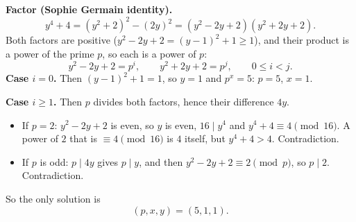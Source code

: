 \textbf{Factor (Sophie Germain identity).}
\[
y^4+4=\left(y^2+2\right)^2-(2y)^2=\left(y^2-2y+2\right)\left(y^2+2y+2\right).
\]
Both factors are positive ($y^2-2y+2=(y-1)^2+1\ge1$), and their product is a power of the prime $p$, so each is a power of $p$:
\[
y^2-2y+2=p^i,\qquad y^2+2y+2=p^j,\qquad 0\le i<j .
\]
\textbf{Case $i=0$.} Then $(y-1)^2+1=1$, so $y=1$ and $p^x=5$: $p=5$, $x=1$.

\textbf{Case $i\ge1$.} Then $p$ divides both factors, hence their difference $4y$.
\begin{itemize}
\item If $p=2$: $y^2-2y+2$ is even, so $y$ is even, $16\mid y^4$ and $y^4+4\equiv4\pmod{16}$. A power of $2$ that is $\equiv4\pmod{16}$ is $4$ itself, but $y^4+4>4$. Contradiction.
\item If $p$ is odd: $p\mid4y$ gives $p\mid y$, and then $y^2-2y+2\equiv2\pmod p$, so $p\mid2$. Contradiction.
\end{itemize}
So the only solution is
\[
(p,x,y)=\boxed{(5,1,1)} .
\]
